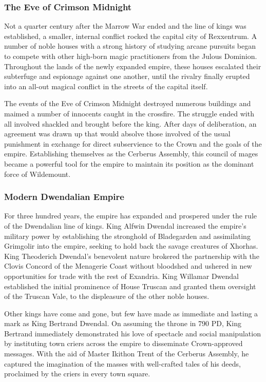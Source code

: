 \documentclass[10pt,a4paper,twoside,bg=print,twocolumn,openany,nodeprecatedcode]{dndbook}
\begin{document}
\subsubsection{The Eve of Crimson Midnight}
Not a quarter century after the Marrow War ended and the line of kings was established, a smaller, internal conflict rocked the capital city of Rexxentrum. A number of noble houses with a strong history of studying arcane pursuits began to compete with other high-born magic practitioners from the Julous Dominion. Throughout the lands of the newly expanded empire, these houses escalated their subterfuge and espionage against one another, until the rivalry finally erupted into an all-out magical conflict in the streets of the capital itself.

The events of the Eve of Crimson Midnight destroyed numerous buildings and maimed a number of innocents caught in the crossfire. The struggle ended with all involved shackled and brought before the king. After days of deliberation, an agreement was drawn up that would absolve those involved of the usual punishment in exchange for direct subservience to the Crown and the goals of the empire. Establishing themselves as the Cerberus Assembly, this council of mages became a powerful tool for the empire to maintain its position as the dominant force of Wildemount.

\subsubsection{Modern Dwendalian Empire}
For three hundred years, the empire has expanded and prospered under the rule of the Dwendalian line of kings. King Alfwin Dwendal increased the empire's military power by establishing the stronghold of Bladegarden and assimilating Grimgolir into the empire, seeking to hold back the savage creatures of Xhorhas. King Theoderich Dwendal's benevolent nature brokered the partnership with the Clovis Concord of the Menagerie Coast without bloodshed and ushered in new opportunities for trade with the rest of Exandria. King Willamar Dwendal established the initial prominence of House Truscan and granted them oversight of the Truscan Vale, to the displeasure of the other noble houses.

Other kings have come and gone, but few have made as immediate and lasting a mark as King Bertrand Dwendal. On assuming the throne in 790 PD, King Bertrand immediately demonstrated his love of spectacle and social manipulation by instituting town criers across the empire to disseminate Crown-approved messages. With the aid of Master Ikithon Trent of the Cerberus Assembly, he captured the imagination of the masses with well-crafted tales of his deeds, proclaimed by the criers in every town square.
\end{document}
